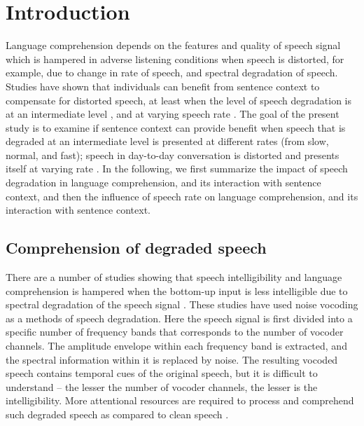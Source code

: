 \documentclass[a4paper, nobind]{templates/ociamthesis}
\begin{document}
\hypertarget{introduction-2}{%
\section{Introduction}\label{introduction-2}}

Language comprehension depends on the features and quality of speech signal
which is hampered in adverse listening conditions when speech is distorted, for example, due to change in rate of speech, and spectral degradation of speech.
Studies have shown that individuals can benefit from sentence context to compensate for distorted speech, at least when the level of speech degradation is at an intermediate level \autocites[e.g.,][]{Bhandari2021,Obleser2010}, and at varying speech rate \autocites{Aydelott2004}[cf.][]{Goy2013}.
The goal of the present study is to examine if sentence context can provide benefit when speech that is degraded at an intermediate level is presented at different rates (from slow, normal, and fast); speech in day-to-day conversation is distorted and presents itself at varying rate \autocite[e.g.,][]{Krause2004}.
In the following, we first summarize the impact of speech degradation in language comprehension, and its interaction with sentence context, and then the influence of speech rate on language comprehension, and its interaction with sentence context.

\hypertarget{comprehension-of-degraded-speech}{%
\subsection{Comprehension of degraded speech}\label{comprehension-of-degraded-speech}}

There are a number of studies showing that speech intelligibility and language comprehension is hampered when the bottom-up input is less intelligible due to spectral degradation of the speech signal \autocite{Shannon1995,Davis2005}.
These studies have used noise vocoding as a methods of speech degradation. Here the speech signal is first divided into a specific number of frequency bands that corresponds to the number of vocoder channels.
The amplitude envelope within each frequency band is extracted, and the spectral information within it is replaced by noise.
The resulting vocoded speech contains temporal cues of the original speech, but it is difficult to understand -- the lesser the number of vocoder channels, the lesser is the intelligibility.
More attentional resources are required to process and comprehend such degraded speech as compared to clean speech \autocites[e.g.,][]{Eckert2016,Wild2012}.
\end{document}
